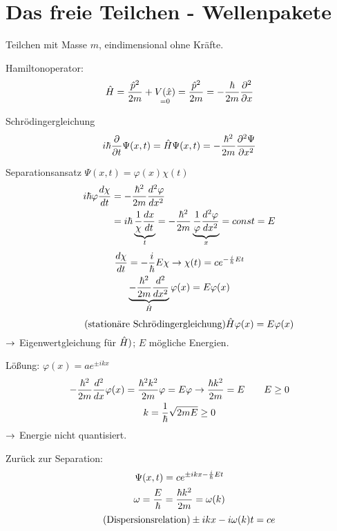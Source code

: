 \section{Das freie Teilchen - Wellenpakete} %
\label{sec:Das_freie_Teilchen_-_Wellenpakete}
Teilchen mit Masse $m$, eindimensional ohne Kräfte.
\begin{erl}{Hamiltonoperator:}
     \begin{equation*}
         \hat{H}=\frac{\hat{p}^2}{2m}+\underset{=0}{V(\hat{x})}=\frac{\hat{p}^2}{2m}= -
         \frac{\hbar}{2m}\frac{\partial^2}{\partial x}
     \end{equation*}
\end{erl}
\begin{erl}{Schrödingergleichung}
      \begin{equation*}
          i \hbar \frac{\partial}{\partial t} \Psi(x,t) = \hat{H} \Psi(x,t) =
          -\frac{\hbar^2}{2m}\frac{\partial^2 \Psi}{\partial x^2}
      \end{equation*}
\end{erl}
Separationsansatz $\Psi(x,t) = \varphi(x) \chi(t)$
\begin{align*}
    i \hbar \varphi \frac{d \chi}{d t} &= -\frac{\hbar^2}{2m} \frac{d^2
    \varphi}{dx^2 } \\
    &=
    i \hbar \underbrace{\frac{1}{\chi}\frac{d x}{d t}}_{t}
    =
    - \frac{\hbar^2}{2m} \underbrace{\frac{1}{\varphi} \frac{d^2
    \varphi}{dx^2}}_{x}
    = const = E
\end{align*}
\begin{gather*}
     \frac{d \chi }{dt}=- \frac{i}{\hbar} E \chi \rightarrow \chi(t) = c
     e^{-\frac{i}{\hbar}E t} \\
     \underbrace{-\frac{\hbar^2}{2m}\frac{d^2}{dx^2}}_{\hat{H}}\varphi(x) = E \varphi(x)
\end{gather*}
\begin{equation*}
    \tag*{\text{(stationäre Schrödingergleichung)}}
    \h{H} \varphi(x) = E \varphi(x)
\end{equation*}
$\rightarrow$ Eigenwertgleichung für $\hat{H})$; $E$ mögliche Energien.

Lößung: $\varphi(x) = a e^{\pm ikx}$
\begin{gather*}
    - \frac{\hbar^2}{2m} \frac{d ^2}{d x} \varphi(x)
    =
    \frac{\hbar^2 k^2}{2m} \varphi = E \varphi
    \rightarrow \frac{\hbar k^2}{2m} = E \qquad E \geq 0 \\
    k = \frac{1}{\hbar} \sqrt{ 2m E} \geq 0
\end{gather*}
$\rightarrow$ Energie nicht quantisiert.

Zurück zur Separation:
\begin{gather*}
    \Psi(x,t) = c e^{\pm ikx - \frac{i}{\hbar} Et}\\
    \omega = \frac{E}{\hbar} = \frac{\hbar k^2}{2m} = \omega(k)
\end{gather*}
\begin{equation*}
    \tag*{\text{(Dispersionsrelation)}}
    \pm ikx - i\omega(k)t = ce
\end{equation*}

